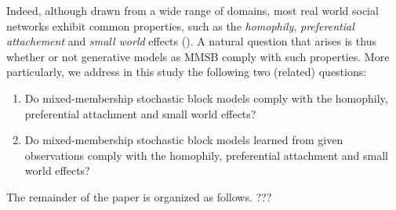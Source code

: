 Indeed, although drawn from a wide range of domains, most real world social networks exhibit common properties, such as the \textit{homophily}, \textit{preferential attachement} and \textit{small world} effects (\cite{Newman2010, Barabasi2003}). 
%
%
A natural question that arises is thus whether or not generative models as MMSB comply with such properties. More particularly, we address in this study the following two (related) questions:
%
\begin{enumerate}
\item Do mixed-membership stochastic block models comply with the homophily, preferential attachment and small world effects?
\item Do  mixed-membership stochastic block models learned from given observations comply with the homophily, preferential attachment and small world effects?
\end{enumerate}

The remainder of the paper is organized as follows. ???

